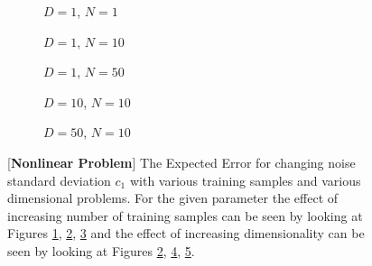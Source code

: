\begin{figure}[!h]
  \centering
    \begin{subfigure}{0.3\textwidth}
      \centering
      \caption{$D=1$, $N=1$}
      \label{fig:nonlinear-c1-N-1-D-1}
    \end{subfigure}
    \begin{subfigure}{0.3\textwidth}
      \centering
      \caption{$D=1$, $N=10$}
      \label{fig:nonlinear-c1-N-10-D-1}
    \end{subfigure}
    \begin{subfigure}{0.3\textwidth}
      \centering
      \caption{$D=1$, $N=50$}
      \label{fig:nonlinear-c1-N-50-D-1}
    \end{subfigure}

    \begin{subfigure}{0.3\textwidth}
      \centering
      \caption{$D=10$, $N=10$}
      \label{fig:nonlinear-c1-N-10-D-10}
    \end{subfigure}
    \begin{subfigure}{0.3\textwidth}
      \centering
      \caption{$D=50$, $N=10$}
      \label{fig:nonlinear-c1-N-10-D-50}
    \end{subfigure}  

  \caption{[\textbf{Nonlinear Problem}] The Expected Error for changing noise standard deviation $c_1$ with various training samples and various dimensional problems. For the given parameter the effect of increasing number of training samples can be seen by looking at Figures \ref{fig:nonlinear-c1-N-1-D-1}, \ref{fig:nonlinear-c1-N-10-D-1}, \ref{fig:nonlinear-c1-N-50-D-1} and the effect of increasing dimensionality can be seen by looking at Figures \ref{fig:nonlinear-c1-N-10-D-1}, \ref{fig:nonlinear-c1-N-10-D-10}, \ref{fig:nonlinear-c1-N-10-D-50}.}\label{fig:nonlinear-c1}
\end{figure}
